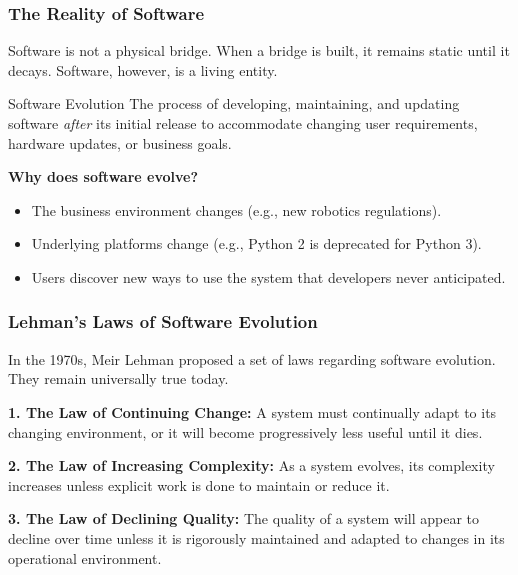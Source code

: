 \documentclass[xcolor=table]{beamer}
\begin{document}
\begin{frame}
    \frametitle{The Reality of Software}
    \small
    Software is not a physical bridge. When a bridge is built, it remains static until it decays. Software, however, is a living entity.
    
    \vspace{0.2cm}
    \begin{block}{Software Evolution}
        The process of developing, maintaining, and updating software \textit{after} its initial release to accommodate changing user requirements, hardware updates, or business goals.
    \end{block}
    
    \vspace{0.2cm}
    \textbf{Why does software evolve?}
    \begin{itemize}
        \item The business environment changes (e.g., new robotics regulations).
        \item Underlying platforms change (e.g., Python 2 is deprecated for Python 3).
        \item Users discover new ways to use the system that developers never anticipated.
    \end{itemize}
\end{frame}

\begin{frame}
    \frametitle{Lehman's Laws of Software Evolution}
    In the 1970s, Meir Lehman proposed a set of laws regarding software evolution. They remain universally true today.
    
    \vspace{0.3cm}
    \textbf{1. The Law of Continuing Change:}
    A system must continually adapt to its changing environment, or it will become progressively less useful until it dies.
    
    \vspace{0.2cm}
    \textbf{2. The Law of Increasing Complexity:}
    As a system evolves, its complexity increases unless explicit work is done to maintain or reduce it.
    
    \vspace{0.2cm}
    \textbf{3. The Law of Declining Quality:}
    The quality of a system will appear to decline over time unless it is rigorously maintained and adapted to changes in its operational environment.
\end{frame}
\end{document}

